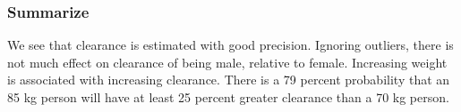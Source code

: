\subsubsection{Summarize}
We see that clearance is estimated with good precision.  Ignoring outliers, there 
is not much effect on clearance of being male, relative to female.  Increasing 
weight is associated with increasing clearance.  There is a 79 percent probability
that an 85 kg person will have at least 25 percent greater clearance than a 70 kg
person.

















